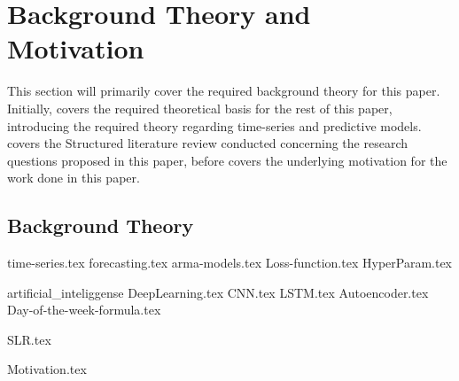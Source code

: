 \chapter{Background Theory and Motivation}\label{T-B}
\label{cha:TheoryAndBackground}


This section will primarily cover the required background theory for this paper.
Initially,  covers the required theoretical basis for the rest of this paper,
introducing the required theory regarding time-series and predictive models.
 covers the Structured literature review conducted concerning the research questions proposed in this paper,
before  covers the underlying motivation for the work done in this paper.



\section{Background Theory}
\label{section:BT:BackgroundTheory}
{time-series.tex}
{forecasting.tex}
{arma-models.tex}
{Loss-function.tex}
{HyperParam.tex}

{artificial_inteliggense}
{DeepLearning.tex}
{CNN.tex}
{LSTM.tex}
{Autoencoder.tex}
{Day-of-the-week-formula.tex}



{SLR.tex}


{Motivation.tex}
